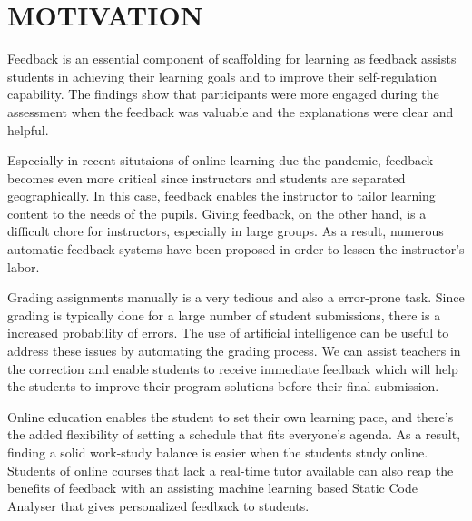 \section{MOTIVATION} %
Feedback is an essential component of scaffolding for learning as
feedback assists students in achieving their learning goals and to
improve their self-regulation capability. The findings show that
participants were more engaged during the assessment when the feedback
was valuable and the explanations were clear and helpful.

Especially in recent situtaions of online learning due the pandemic,
feedback becomes even more critical since instructors and students are
separated geographically. In this case, feedback enables the
instructor to tailor learning content to the needs of the
pupils. Giving feedback, on the other hand, is a difficult chore for
instructors, especially in large groups. As a result, numerous
automatic feedback systems have been proposed in order to lessen the
instructor's labor.

Grading assignments manually is a very tedious and also a error-prone
task. Since grading is typically done for a large number of
student submissions, there is a increased probability of errors. The
use of artificial intelligence can be useful to address these issues
by automating the grading process. We can assist teachers in the
correction and enable students to receive immediate feedback which
will help the students to improve their program solutions before their
final submission.

\iffalse
Online education in general is less expensive and more affordable than
traditional classroom education. There is also often a wide range of
payment options that let you pay in installments or per class. This
allows for financially disadvantaged students to upskill themselves to
open avenues for better career opportunities. Money can also be saved
from the commute and class materials which are often available for
free. In other words, the monetary investment is less, but the results
can be comparable to other options.
\fi

Online education enables the student to set their own learning pace,
and there's the added flexibility of setting a schedule that fits
everyone's agenda. As a result, finding a solid work-study balance is
easier when the students study online. Students of online courses that
lack a real-time tutor available can also reap the benefits of
feedback with an assisting machine learning based Static Code Analyser
that gives personalized feedback to students.


